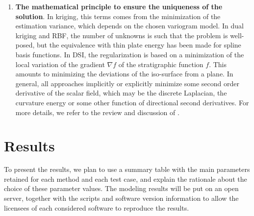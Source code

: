 \documentclass[preprint]{elsarticle}
\begin{document}
\begin{enumerate}
\item \textbf{The mathematical principle to ensure the uniqueness of the solution}. In kriging, this terms comes from the minimization of the estimation variance, which depends on the chosen variogram model. In dual kriging and RBF, the number of unknowns is such that the problem is well-posed, but the equivalence with thin plate energy has been made for spline basis functions. In DSI, the regularization is based on a minimization of the local variation of the gradient $\nabla f$ of the stratigraphic function $f$. This amounts to minimizing the deviations of the iso-surface from a plane. In general, all approaches implicitly or explicitly minimize some second order derivative of the scalar field, which may be the discrete Laplacian, the curvature energy or some other function of directional second derivatives. For more details, we refer to the review and discussion of \citet{Renaudeau2019MG}.

\end{enumerate}


\section{Results}\label{sec:results}


To present the results, we plan to use a summary table with the main parameters retained for each method and each test case, and explain the rationale about the choice of these parameter values. The modeling results will be put on an open server, together with the scripts and software version information to allow the licensees of each considered software to reproduce the results. 

\end{document}

